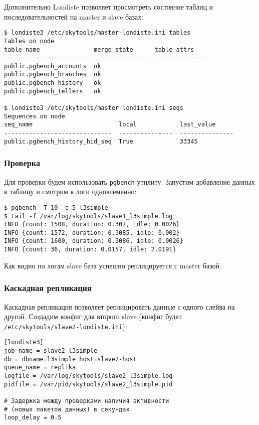 Дополнительно Londiste позволяет просмотреть состояние таблиц и последовательностей на master и slave базах:

\begin{lstlisting}[label=lst:londiste-replica17,caption=Статус таблиц и последовательностей]
$ londiste3 /etc/skytools/master-londiste.ini tables
Tables on node
table_name               merge_state      table_attrs
-----------------------  ---------------  ---------------
public.pgbench_accounts  ok
public.pgbench_branches  ok
public.pgbench_history   ok
public.pgbench_tellers   ok

$ londiste3 /etc/skytools/master-londiste.ini seqs
Sequences on node
seq_name                        local            last_value
------------------------------  ---------------  ---------------
public.pgbench_history_hid_seq  True             33345
\end{lstlisting}



\subsubsection{Проверка}

Для проверки будем использовать \lstinline!pgbench! утилиту. Запустим добавление данных в таблицу и смотрим в логи одновлеменно:

\begin{lstlisting}[label=lst:londiste-check1,caption=Проверка]
$ pgbench -T 10 -c 5 l3simple
$ tail -f /var/log/skytools/slave1_l3simple.log
INFO {count: 1508, duration: 0.307, idle: 0.0026}
INFO {count: 1572, duration: 0.3085, idle: 0.002}
INFO {count: 1600, duration: 0.3086, idle: 0.0026}
INFO {count: 36, duration: 0.0157, idle: 2.0191}
\end{lstlisting}

Как видно по логам slave база успешно реплицируется с master базой.


\subsubsection{Каскадная репликация}

Каскадная репликация позволяет реплицировать данные с одного слейва на другой. Создадим конфиг для второго slave (конфиг будет \lstinline!/etc/skytools/slave2-londiste.ini!):

\begin{lstlisting}[label=lst:londiste-cascade1,caption=Конфиг для slave2]
[londiste3]
job_name = slave2_l3simple
db = dbname=l3simple host=slave2-host
queue_name = replika
logfile = /var/log/skytools/slave2_l3simple.log
pidfile = /var/pid/skytools/slave2_l3simple.pid

# Задержка между проверками наличия активности
# (новых пакетов данных) в секундах
loop_delay = 0.5
\end{lstlisting}

